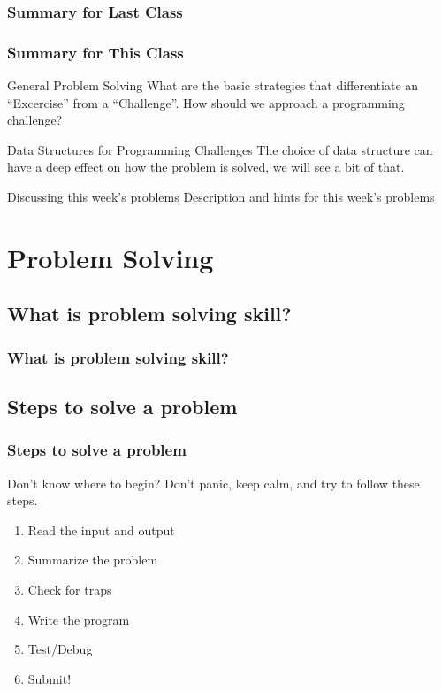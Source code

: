 \documentclass{beamer}
\begin{document}
\begin{frame}
  \frametitle{Summary for Last Class}
\end{frame}

\begin{frame}
  \frametitle{Summary for This Class}

  \begin{block}{General Problem Solving}
    What are the basic strategies that differentiate an ``Excercise''
    from a ``Challenge''. How should we approach a programming
    challenge?
  \end{block}

  \begin{block}{Data Structures for Programming Challenges}
    The choice of data structure can have a deep effect on how the
    problem is solved, we will see a bit of that.
  \end{block}
  \begin{block}{Discussing this week's problems}
    Description and hints for this week's problems
  \end{block}

\end{frame}

\section{Problem Solving}
\subsection{What is problem solving skill?}

\begin{frame}
  \frametitle{What is problem solving skill?}



\end{frame}

\subsection{Steps to solve a problem}
\begin{frame}
  \frametitle{Steps to solve a problem} 

  Don't know where to begin?  Don't panic, keep calm, and try to
  follow these steps.

  \begin{enumerate}
  \item Read the input and output
  \item Summarize the problem
  \item Check for traps
  \item Write the program
  \item Test/Debug
  \item Submit!
  \end{enumerate}
\end{frame}
\end{document}
